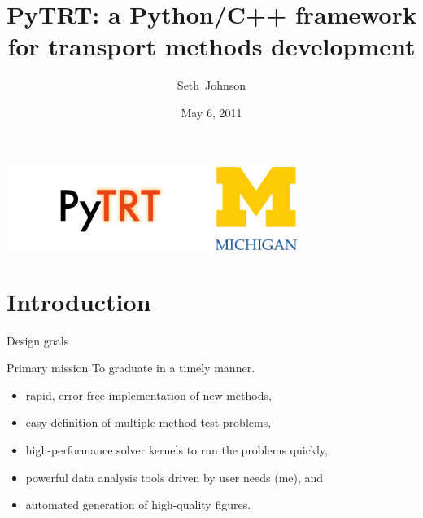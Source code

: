 \documentclass{beamer}
\title[PyTRT]%
{PyTRT: a Python/C++ framework for transport methods development}
\author[SRJ]{Seth~Johnson}
\institute[UMich]{
University of Michigan, Ann Arbor
}
\date[5/6/2011]{May 6, 2011}
\begin{document}

\begin{frame}
\titlepage
\begin{center}
  \includegraphics[width=0.5\textwidth]{logo}
  \hspace{.5in}
  \includegraphics[width=0.2\textwidth]{../figures/umlogo}
\end{center}
\end{frame}

\section{Introduction}
\begin{frame}{Design goals}
\begin{block}{Primary mission}
   To graduate in a timely manner.
\end{block}


\begin{itemize}
  \item rapid, error-free implementation of new methods,
  \item easy definition of multiple-method test problems,
  \item high-performance solver kernels to run the problems quickly,
  \item powerful data analysis tools driven by user needs (me), and
  \item automated generation of high-quality figures.
\end{itemize}
  
\end{frame}
\end{document}
